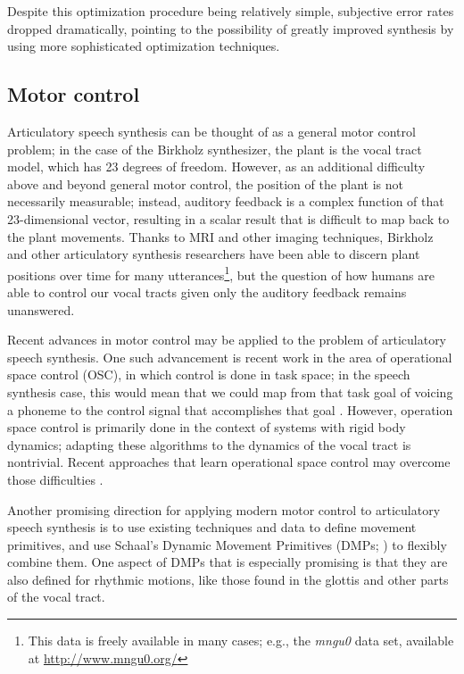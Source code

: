 \documentclass{article}
\begin{document}
Despite this optimization procedure
being relatively simple,
subjective error rates dropped dramatically,
pointing to the possibility
of greatly improved synthesis
by using more sophisticated optimization techniques.

\subsection{Motor control}
\label{subsec:motor-control}

Articulatory speech synthesis
can be thought of as a
general motor control problem;
in the case of the Birkholz synthesizer,
the plant is the vocal tract model,
which has 23 degrees of freedom.
However, as an additional difficulty
above and beyond general motor control,
the position of the plant is
not necessarily measurable;
instead, auditory feedback is
a complex function of that
23-dimensional vector,
resulting in a scalar result
that is difficult to map
back to the plant movements.
Thanks to MRI and other
imaging techniques,
Birkholz and other articulatory
synthesis researchers have
been able to discern
plant positions over time
for many utterances\footnote{This
data is freely available in many cases;
e.g., the \textit{mngu0} data set,
available at \url{http://www.mngu0.org/}},
but the question of how humans
are able to control our vocal tracts
given only the auditory feedback
remains unanswered.

Recent advances in motor control
may be applied to the problem
of articulatory speech synthesis.
One such advancement is recent work
in the area of operational space control (OSC),
in which control is done in task space;
in the speech synthesis case,
this would mean that we could
map from that task goal
of voicing a phoneme
to the control signal
that accomplishes that goal
\citep{nakanishi2008}.
However, operation space control
is primarily done in the context
of systems with rigid body dynamics;
adapting these algorithms
to the dynamics of the vocal tract
is nontrivial.
Recent approaches that learn
operational space control
may overcome those difficulties
\citep{peters2008}.

Another promising direction
for applying modern motor control
to articulatory speech synthesis
is to use existing techniques and data
to define movement primitives,
and use Schaal's Dynamic Movement Primitives
(DMPs; \citealp{schaal2006})
to flexibly combine them.
One aspect of DMPs that is especially promising
is that they are also defined
for rhythmic motions,
like those found in the glottis
and other parts of the vocal tract.
\end{document}
